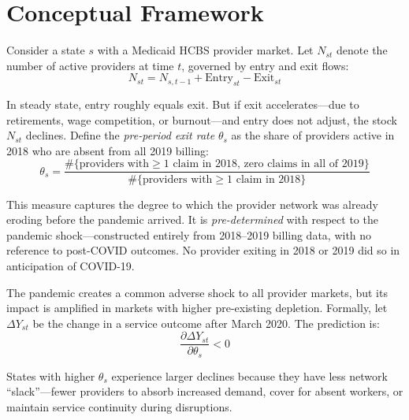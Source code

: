 \documentclass[12pt]{article}
\begin{document}
\section{Conceptual Framework}

Consider a state $s$ with a Medicaid HCBS provider market. Let $N_{st}$ denote the number of active providers at time $t$, governed by entry and exit flows:
\begin{equation}
N_{st} = N_{s,t-1} + \text{Entry}_{st} - \text{Exit}_{st}
\end{equation}

In steady state, entry roughly equals exit. But if exit accelerates---due to retirements, wage competition, or burnout---and entry does not adjust, the stock $N_{st}$ declines. Define the \emph{pre-period exit rate} $\theta_s$ as the share of providers active in 2018 who are absent from all 2019 billing:
\begin{equation}
\theta_s = \frac{\#\{\text{providers with} \geq 1 \text{ claim in 2018, zero claims in all of 2019}\}}{\#\{\text{providers with} \geq 1 \text{ claim in 2018}\}}
\end{equation}

This measure captures the degree to which the provider network was already eroding before the pandemic arrived. It is \emph{pre-determined} with respect to the pandemic shock---constructed entirely from 2018--2019 billing data, with no reference to post-COVID outcomes. No provider exiting in 2018 or 2019 did so in anticipation of COVID-19.

The pandemic creates a common adverse shock to all provider markets, but its impact is amplified in markets with higher pre-existing depletion. Formally, let $\Delta Y_{st}$ be the change in a service outcome after March 2020. The prediction is:
\begin{equation}
\frac{\partial \Delta Y_{st}}{\partial \theta_s} < 0
\end{equation}

States with higher $\theta_s$ experience larger declines because they have less network ``slack''---fewer providers to absorb increased demand, cover for absent workers, or maintain service continuity during disruptions.
\end{document}
